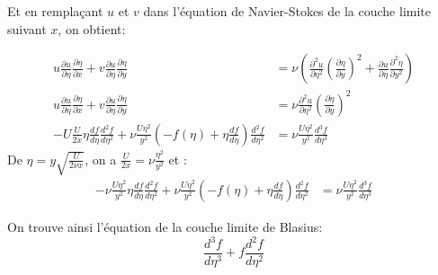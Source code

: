 \documentclass[french]{article}
\begin{document}
Et en remplaçant $u$ et $v$ dans l'équation de Navier-Stokes de la couche limite suivant $x$, on obtient:


\begin{align*}	
	u\frac{\partial u}{\partial \eta}
	\frac{\partial \eta}{\partial x} + 
	v\frac{\partial u}{\partial \eta} 
	\frac{\partial \eta}{\partial y}
	&= \nu\left(
	\frac{\partial^{2} u}{\partial  \eta^{2}}
	\left(
	\frac{\partial \eta}{\partial  y}
	\right)^{2} +
	\frac{\partial u}{\partial  \eta}
	\frac{\partial^{2} \eta}{\partial  y^{2}}
	\right)\\
	u\frac{\partial u}{\partial \eta}
	\frac{\partial \eta}{\partial x} + 
	v\frac{\partial u}{\partial \eta} 
	\frac{\partial \eta}{\partial y}
	&= \nu
	\frac{\partial^{2} u}{\partial  \eta^{2}}
	\left(
	\frac{\partial \eta}{\partial  y}
	\right)^{2} \\
	-U\frac{U}{2x} 
	\eta
	\frac{d f}{d \eta}
	\frac{d^{2} f}{d \eta^{2}}
	+ 
	\nu
	\frac{U\eta^{2}}{y^{2}}
	\left(
	-f(\eta) + \eta\frac{d f}{d \eta}
	\right)
	\frac{d^{2} f}{d \eta^{2}} 
	&= \nu
	\frac{U\eta^{2}}{y^{2}}
	\frac{d^{3} f}{d\eta^{3}}
\end{align*}
De $\eta = y \sqrt{\frac{U}{2\nu x }}$, on a $
	\frac{U}{2x} = \nu 
	\frac{\eta^{2}}{y^{2}}
$ et : 
\begin{align*}	
	-\nu
	\frac{U\eta^{2}}{y^{2}} 
	\eta
	\frac{d f}{d \eta}
	\frac{d^{2} f}{d \eta^{2}}
	+ 
	\nu
	\frac{U\eta^{2}}{y^{2}}
	\left(
	-f(\eta) + \eta\frac{d f}{d \eta}
	\right)
	\frac{d^{2} f}{d \eta^{2}} 
	&= \nu
	\frac{U\eta^{2}}{y^{2}}
	\frac{d^{3} f}{d\eta^{3}}
\end{align*}

On trouve ainsi l'équation de la couche limite de Blasius:
\begin{equation}	
	\frac{d^{3}f}{d\eta^{3}} + f\frac{d^{2} f}{d\eta^{2}}
\end{equation}
\end{document}
